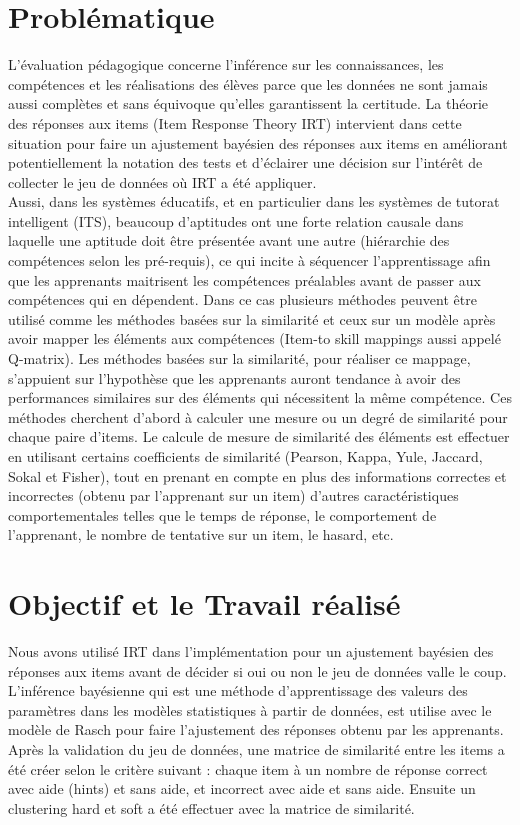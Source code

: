 \section*{Problématique}
L'évaluation pédagogique concerne l'inférence sur les connaissances, les compétences et les réalisations des élèves parce que les données ne sont jamais aussi complètes et sans équivoque qu'elles garantissent la certitude. La théorie des réponses aux items (Item Response Theory IRT) intervient dans cette situation pour faire un ajustement bayésien des réponses aux items en améliorant potentiellement la notation des tests et d’éclairer une décision sur l'intérêt de collecter le jeu de données où IRT a été appliquer. \\
Aussi, dans les systèmes éducatifs, et en particulier dans les systèmes de tutorat intelligent (ITS), beaucoup d’aptitudes ont une forte relation causale dans laquelle une aptitude doit être présentée avant une autre (hiérarchie des compétences selon les pré-requis), ce qui incite à séquencer l’apprentissage afin que les apprenants maitrisent les compétences préalables avant de passer aux compétences qui en dépendent. Dans ce cas plusieurs méthodes peuvent être utilisé comme les méthodes basées sur la similarité et ceux sur un modèle après avoir mapper les éléments aux compétences (Item-to skill mappings aussi appelé Q-matrix). Les méthodes basées sur la similarité, pour réaliser ce mappage, s’appuient sur l’hypothèse que les apprenants auront tendance à avoir des performances similaires sur des éléments qui nécessitent la même compétence. Ces méthodes cherchent d’abord à calculer une mesure ou un degré de similarité pour chaque paire d’items. Le calcule de mesure de similarité des éléments est effectuer en utilisant certains coefficients de similarité (Pearson, Kappa, Yule, Jaccard, Sokal et Fisher), tout en prenant en compte en plus des informations correctes et incorrectes (obtenu par l’apprenant sur un item) d’autres caractéristiques comportementales telles que le temps de réponse, le comportement de l’apprenant, le nombre de tentative sur un item, le hasard, etc.

\section*{Objectif et le Travail réalisé }
Nous avons utilisé IRT dans l’implémentation pour un ajustement bayésien des réponses aux items avant de décider si oui ou non le jeu de données valle le coup. L’inférence bayésienne qui est une méthode d’apprentissage des valeurs des paramètres dans les modèles statistiques à partir de données, est utilise avec le modèle de Rasch pour faire l’ajustement des réponses obtenu par les apprenants. \\
Après la validation du jeu de données, une matrice de similarité entre les items a été créer selon le critère suivant : chaque item à un nombre de réponse correct avec aide (hints) et sans aide, et incorrect avec aide et sans aide. Ensuite un clustering hard et soft a été effectuer avec la matrice de similarité.

